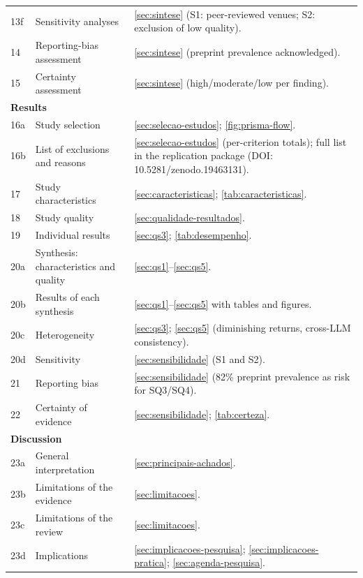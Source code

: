 \begin{longtable}{p{0.5cm}p{4.5cm}p{8.5cm}}
13f & Sensitivity analyses
    & \autoref{sec:sintese} (S1: peer-reviewed venues; S2: exclusion of low quality). \\
14 & Reporting-bias assessment
   & \autoref{sec:sintese} (preprint prevalence acknowledged). \\
15 & Certainty assessment
   & \autoref{sec:sintese} (high/moderate/low per finding). \\
\midrule
\multicolumn{3}{l}{\textbf{Results}} \\
\midrule
16a & Study selection
    & \autoref{sec:selecao-estudos}; \autoref{fig:prisma-flow}. \\
16b & List of exclusions and reasons
    & \autoref{sec:selecao-estudos} (per-criterion totals); full list in the replication
      package (DOI: 10.5281/zenodo.19463131). \\
17  & Study characteristics
    & \autoref{sec:caracteristicas}; \autoref{tab:caracteristicas}. \\
18  & Study quality
    & \autoref{sec:qualidade-resultados}. \\
19  & Individual results
    & \autoref{sec:qs3}; \autoref{tab:desempenho}. \\
20a & Synthesis: characteristics and quality
    & \autoref{sec:qs1}--\autoref{sec:qs5}. \\
20b & Results of each synthesis
    & \autoref{sec:qs1}--\autoref{sec:qs5} with tables and figures. \\
20c & Heterogeneity
    & \autoref{sec:qs3}; \autoref{sec:qs5} (diminishing returns, cross-LLM
      consistency). \\
20d & Sensitivity
    & \autoref{sec:sensibilidade} (S1 and S2). \\
21  & Reporting bias
    & \autoref{sec:sensibilidade} (82\% preprint prevalence as risk for SQ3/SQ4). \\
22  & Certainty of evidence
    & \autoref{sec:sensibilidade}; \autoref{tab:certeza}. \\
\midrule
\multicolumn{3}{l}{\textbf{Discussion}} \\
\midrule
23a & General interpretation
    & \autoref{sec:principais-achados}. \\
23b & Limitations of the evidence
    & \autoref{sec:limitacoes}. \\
23c & Limitations of the review
    & \autoref{sec:limitacoes}. \\
23d & Implications
    & \autoref{sec:implicacoes-pesquisa}; \autoref{sec:implicacoes-pratica};
      \autoref{sec:agenda-pesquisa}. \\

\end{longtable}
